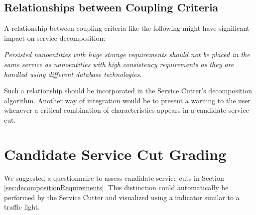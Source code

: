 \subsection{Relationships between Coupling Criteria}

A relationship between coupling criteria like the following might have significant impact on service decomposition:

\textit{Persisted nanoentities with huge storage requirements should not be placed in the same service as nanoentities with high consistency requirements as they are handled using different database technologies.}

Such a relationship should be incorporated in the Service Cutter's decomposition algorithm. Another way of integration would be to present a warning to the user whenever a critical combination of characteristics appears in a candidate service cut.

\section{Candidate Service Cut Grading}
\label{sec:suggested-cut-grades}

We suggested a questionnaire to assess candidate service cuts in Section \ref{sec:decompositionRequirements}. This distinction could automatically be performed by the Service Cutter and visualized using a indicator similar to a traffic light.





